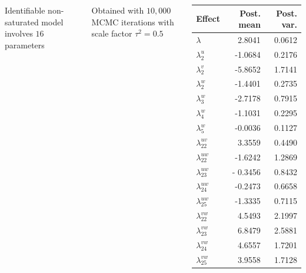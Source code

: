 \begin{slide}

\begin{columns}
Identifiable non-saturated model involves $16$ parameters

Obtained with
$10,000$ MCMC iterations with scale factor $\tau^2=0.5$

\footnotesize
\begin{tabular}{l|r r}
            Effect  & Post. mean  & Post. var. \\
\hline $\lambda$     &  2.8041     & 0.0612 \\
 $\lambda^u_2$       & -1.0684     & 0.2176 \\
 $\lambda^v_2$       & -5.8652     & 1.7141 \\
 $\lambda^w_2$       & -1.4401     & 0.2735 \\
 $\lambda^w_3$       & -2.7178     & 0.7915 \\
 $\lambda^w_4$       & -1.1031     & 0.2295 \\
 $\lambda^w_5$       & -0.0036     & 0.1127 \\
 $\lambda^{uv}_{22}$ &  3.3559     & 0.4490 \\
 $\lambda^{uw}_{22}$ & -1.6242     & 1.2869 \\
 $\lambda^{uw}_{23}$ &- 0.3456     & 0.8432 \\
 $\lambda^{uw}_{24}$ & -0.2473     & 0.6658 \\
 $\lambda^{uw}_{25}$ & -1.3335     & 0.7115 \\
 $\lambda^{vw}_{22}$ &  4.5493     & 2.1997 \\
 $\lambda^{vw}_{23}$ &  6.8479     & 2.5881 \\
 $\lambda^{vw}_{24}$ &  4.6557     & 1.7201 \\
 $\lambda^{vw}_{25}$ &  3.9558     & 1.7128
\end{tabular}
\normalsize
\end{columns}

\end{slide}\begin{slide}


\end{slide}
